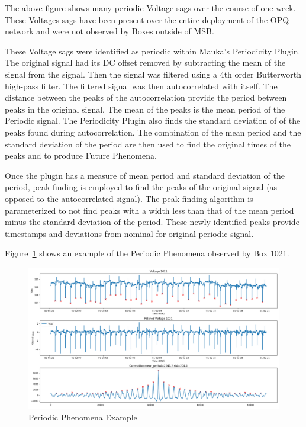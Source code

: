 The above figure shows many periodic Voltage sags over the course of one week. These Voltages sags have been present over the entire deployment of the OPQ network and were not observed by Boxes outside of MSB.

These Voltage sags were identified as periodic within Mauka's Periodicity Plugin. The original signal had its DC offset removed by subtracting the mean of the signal from the signal. Then the signal was filtered using a 4th order Butterworth high-pass filter. The filtered signal was then autocorrelated with itself. The distance between the peaks of the autocorrelation provide the period between peaks in the original signal. The mean of the peaks is the mean period of the Periodic signal. The Periodicity Plugin also finds the standard deviation of of the peaks found during autocorrelation. The combination of the mean period and the standard deviation of the period are then used to find the original times of the peaks and to produce Future Phenomena.

Once the plugin has a measure of mean period and standard deviation of the period, peak finding is employed to find the peaks of the original signal (as opposed to the autocorrelated signal). The peak finding algorithm is parameterized to not find peaks with a width less than that of the mean period minus the standard deviation of the period. These newly identified peaks provide timestamps and deviations from nominal for original periodic signal.

Figure~\ref{fig:periodic_example_2} shows an example of the Periodic Phenomena observed by Box 1021.

\begin{figure}[h]
    \centering
    \includegraphics[width=\linewidth]{figures/periodic_example.png}
    \caption{Periodic Phenomena Example}
    \label{fig:periodic_example_2}
\end{figure}

